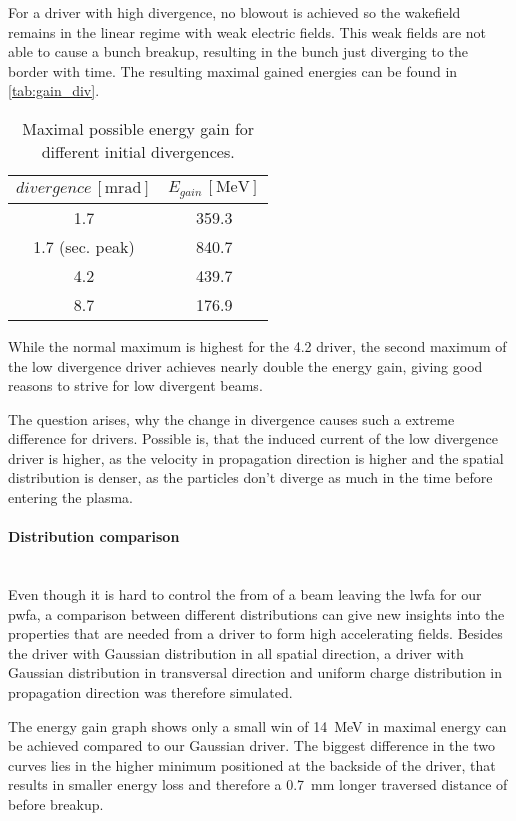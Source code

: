 \documentclass[bachelor_thesis]{subfiles}
\begin{document}
For a driver with high divergence, no blowout is achieved so the wakefield remains in the linear regime with weak electric fields. This weak fields are not able to cause a bunch breakup, resulting in the bunch just diverging to the border with time.
The resulting maximal gained energies can be found in \autoref{tab:gain_div}.
\begin{table}[h]
\begin{center}
\begin{tabular}{|c|c|} 
	\hline
 	$divergence \, \mathrm{[mrad]}$ & $E_{gain} \, \mathrm{[MeV]}$ \\ 
 	\hline
	1.7 & 359.3 \\ 
	1.7 (sec. peak) & 840.7 \\ 
 	4.2 & 439.7 \\
	8.7 & 176.9 \\
	\hline
\end{tabular}
\caption{Maximal possible energy gain for different initial divergences.}\label{tab:gain_div}
\end{center}
\end{table}
While the normal maximum is highest for the \qty{4.2}{\mrad} driver, the second maximum of the low divergence driver achieves nearly double the energy gain, giving good reasons to strive for low divergent beams.
 
The question arises, why the change in divergence causes such a extreme difference for drivers. Possible is, that the induced current of the low divergence driver is higher, as the velocity in propagation direction is higher and the spatial distribution
is denser, as the particles don't diverge as much in the time before entering the plasma. 


\paragraph*{Distribution comparison}\hspace{0pt} \\
Even though it is hard to control the from of a beam leaving the \gls{lwfa} for our \gls{pwfa}, a comparison between different distributions can give new insights into the properties that are needed from a driver
to form high accelerating fields. Besides the driver with Gaussian distribution in all spatial direction, a driver with Gaussian distribution in transversal direction and uniform charge distribution in propagation direction 
was therefore simulated.

The energy gain graph  shows only a small win of \qty{14}{\MeV} in maximal energy can be achieved compared to our Gaussian driver. The biggest difference in the two curves lies
in the higher minimum positioned at the backside of the driver, that results in smaller energy loss and therefore a \qty{0.7}{mm} longer traversed distance of before breakup.
\end{document}
